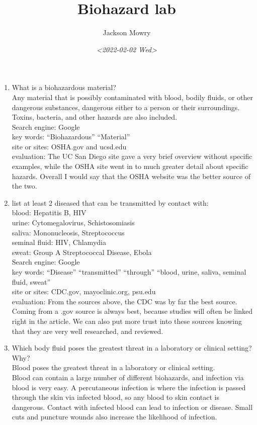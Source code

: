 \documentclass[letterpaper, 11pt]{article}
\author{Jackson Mowry}
\date{\textit{<2022-02-02 Wed>}}
\title{Biohazard lab}
\begin{document}
\maketitle
\tableofcontents

\begin{enumerate}
\item What is a biohazardous material?\\
Any material that is possibly contaminated with blood, bodily fluids, or other dangerous substances, dangerous either to a person or their surroundings. Toxins, bacteria, and other hazards are also included.\\
Search engine: Google\\
key words: ``Biohazardous'' ``Material''\\
site or sites: OSHA.gov and ucsd.edu\\
evaluation: The UC San Diego site gave a very brief overview without specific examples, while the OSHA site went in to much greater detail about specific hazards. Overall I would say that the OSHA website was the better source of the two.\\

\item list at least 2 diseased that can be transmitted by contact with:\\
blood: Hepatitis B, HIV\\
urine: Cytomegalovirus, Schistosomiasis\\
saliva: Mononucleosis, Streptococcus\\
seminal fluid: HIV, Chlamydia\\
sweat: Group A Streptococcal Disease, Ebola\\

Search engine: Google\\
key words: ``Disease'' ``transmitted'' ``through'' ``blood, urine, saliva, seminal fluid, sweat''\\
site or sites: CDC.gov, mayoclinic.org, psu.edu\\
evaluation: From the sources above, the CDC was by far the best source. Coming from a .gov source is always best, because studies will often be linked right in the article. We can also put more trust into these sources knowing that they are very well researched, and reviewed.\\

\item Which body fluid poses the greatest threat in a laboratory or clinical setting?\\
Why?\\
Blood poses the greatest threat in a laboratory or clinical setting.\\
Blood can contain a large number of different biohazards, and infection via blood is very easy. A percutaneous infection is where the infection is passed through the skin via infected blood, so any blood to skin contact is dangerous. Contact with infected blood can lead to infection or disease. Small cuts and puncture wounds also increase the likelihood of infection.\\


\end{enumerate}
\end{document}
